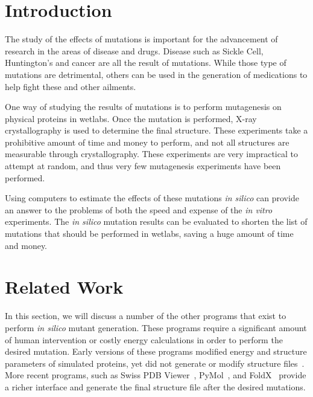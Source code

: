 \documentclass[sigconf]{acmart}
\begin{document}

\maketitle

\section{Introduction}
The study of the effects of mutations is important for the advancement of research in the areas of disease and drugs.  Disease such as Sickle Cell, Huntington's and cancer are all the result of mutations.  While those type of mutations are detrimental, others can be used in the generation of medications to help fight these and other ailments.

One way of studying the results of mutations is to perform mutagenesis on physical proteins in wetlabs.  Once the mutation is performed, X-ray crystallography is used to determine the final structure.  These experiments take a prohibitive amount of time and money to perform, and not all structures are measurable through crystallography.  These experiments are very impractical to attempt at random, and thus very few mutagenesis experiments have been performed.

Using computers to estimate the effects of these mutations \textit{in silico} can provide an answer to the problems of both the speed and expense of the \textit{in vitro} experiments.  The \textit{in silico} mutation results can be evaluated to shorten the list of mutations that should be performed in wetlabs, saving a huge amount of time and money.


\section{Related Work}
In this section, we will discuss a number of the other programs that exist to perform \textit{in silico} mutant generation.  These programs require a significant amount of human intervention or costly energy calculations in order to perform the desired mutation.  Early versions of these programs modified energy and structure parameters of simulated proteins, yet did not generate or modify structure files~\cite{you2002}.  More recent programs, such as Swiss PDB Viewer~\cite{guex1997}, PyMol~\cite{delano2002}, and FoldX~\cite{schymkowitz2005} provide a richer interface and generate the final structure file after the desired mutations.
\end{document}
